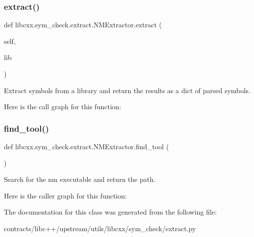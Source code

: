 \subsubsection{\texorpdfstring{extract()}{extract()}}
{\footnotesize\ttfamily def libcxx.\+sym\+\_\+check.\+extract.\+N\+M\+Extractor.\+extract (\begin{DoxyParamCaption}\item[{}]{self,  }\item[{}]{lib }\end{DoxyParamCaption})}

\begin{DoxyVerb}Extract symbols from a library and return the results as a dict of
parsed symbols.
\end{DoxyVerb}
 Here is the call graph for this function\+:
\mbox{\label{classlibcxx_1_1sym__check_1_1extract_1_1_n_m_extractor_aec56c895c4fac5589f108c9a12ea4f3f}} 
\subsubsection{\texorpdfstring{find\+\_\+tool()}{find\_tool()}}
{\footnotesize\ttfamily def libcxx.\+sym\+\_\+check.\+extract.\+N\+M\+Extractor.\+find\+\_\+tool (\begin{DoxyParamCaption}{ }\end{DoxyParamCaption})\hspace{0.3cm}{\ttfamily [static]}}

\begin{DoxyVerb}Search for the nm executable and return the path.
\end{DoxyVerb}
 Here is the caller graph for this function\+:


The documentation for this class was generated from the following file\+:\begin{DoxyCompactItemize}
\item 
contracts/libc++/upstream/utils/libcxx/sym\+\_\+check/extract.\+py\end{DoxyCompactItemize}
